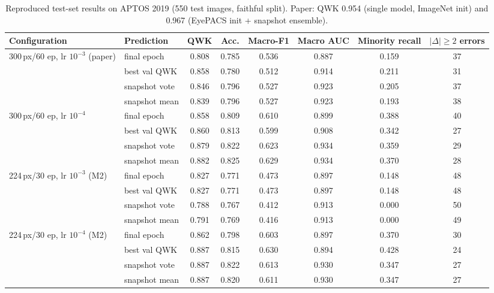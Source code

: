 \begin{table}[t]
\centering
\caption{Reproduced test-set results on APTOS 2019 (550 test images, faithful split). Paper: QWK 0.954 (single model, ImageNet init) and 0.967 (EyePACS init + snapshot ensemble).}
\label{tab:main}
\footnotesize
\begin{tabular}{llcccccc}
\toprule
Configuration & Prediction & QWK & Acc. & Macro-F1 & Macro AUC & Minority recall & $|\Delta|\geq2$ errors \\
\midrule
300\,px/60 ep, lr $10^{-3}$ (paper) & final epoch & 0.808 & 0.785 & 0.536 & 0.887 & 0.159 & 37 \\
 & best val QWK & 0.858 & 0.780 & 0.512 & 0.914 & 0.211 & 31 \\
 & snapshot vote & 0.846 & 0.796 & 0.527 & 0.923 & 0.205 & 37 \\
 & snapshot mean & 0.839 & 0.796 & 0.527 & 0.923 & 0.193 & 38 \\
\midrule
300\,px/60 ep, lr $10^{-4}$ & final epoch & 0.858 & 0.809 & 0.610 & 0.899 & 0.388 & 40 \\
 & best val QWK & 0.860 & 0.813 & 0.599 & 0.908 & 0.342 & 27 \\
 & snapshot vote & 0.879 & 0.822 & 0.623 & 0.934 & 0.359 & 29 \\
 & snapshot mean & 0.882 & 0.825 & 0.629 & 0.934 & 0.370 & 28 \\
\midrule
224\,px/30 ep, lr $10^{-3}$ (M2) & final epoch & 0.827 & 0.771 & 0.473 & 0.897 & 0.148 & 48 \\
 & best val QWK & 0.827 & 0.771 & 0.473 & 0.897 & 0.148 & 48 \\
 & snapshot vote & 0.788 & 0.767 & 0.412 & 0.913 & 0.000 & 50 \\
 & snapshot mean & 0.791 & 0.769 & 0.416 & 0.913 & 0.000 & 49 \\
\midrule
224\,px/30 ep, lr $10^{-4}$ (M2) & final epoch & 0.862 & 0.798 & 0.603 & 0.897 & 0.370 & 30 \\
 & best val QWK & 0.887 & 0.815 & 0.630 & 0.894 & 0.428 & 24 \\
 & snapshot vote & 0.887 & 0.822 & 0.613 & 0.930 & 0.347 & 27 \\
 & snapshot mean & 0.887 & 0.820 & 0.611 & 0.930 & 0.347 & 27 \\
\bottomrule
\end{tabular}
\end{table}
